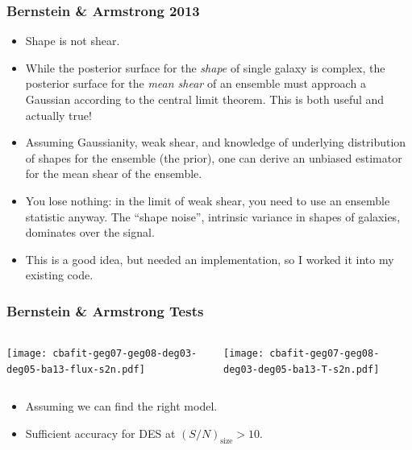 \documentclass{beamer}
\newcommand{\snT}{$(S/N)_{\textrm{size}}$}
\begin{document}
\frame
{
    \frametitle{Bernstein \& Armstrong 2013}

    \begin{itemize}

        \item Shape is not shear.
        \item While the posterior surface for the {\it shape} of single galaxy
            is complex, the posterior surface for the {\it mean shear} of an
            ensemble must approach a Gaussian according to the central limit
            theorem.  This is both useful and actually true!

         \item Assuming Gaussianity, weak shear, and knowledge of underlying
             distribution of shapes for the ensemble (the prior), one can
             derive an unbiased estimator for the mean shear of the ensemble.

         \item You lose nothing: in the limit of weak shear, you need
             to use an ensemble statistic anyway.  The ``shape noise'',
             intrinsic variance in shapes of galaxies, dominates over
             the signal.

        \item This is a good idea, but needed an implementation, so I worked it
            into my existing code.
         
    \end{itemize}

}

\frame
{
    \frametitle{Bernstein \& Armstrong Tests}

    \begin{columns}
        
        \begin{column}{0.5\textwidth}
            \texttt{[image: cbafit-geg07-geg08-deg03-deg05-ba13-flux-s2n.pdf]}
        \end{column}

        \begin{column}{0.5\textwidth}
            \texttt{[image: cbafit-geg07-geg08-deg03-deg05-ba13-T-s2n.pdf]}
        \end{column}
    \end{columns}

    \begin{itemize}
        \item Assuming we can find the right model.
        \item Sufficient accuracy for DES at \snT$ > 10$.
    \end{itemize}
}
\end{document}
